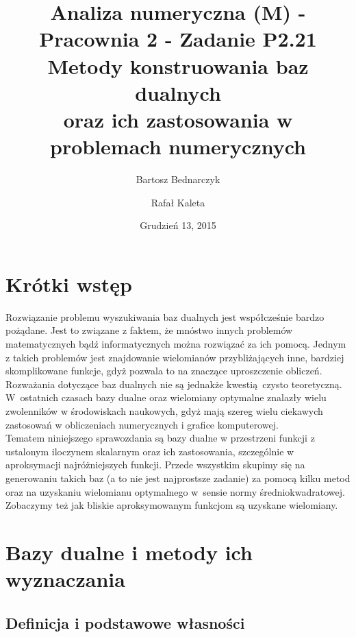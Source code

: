 \documentclass{article}
\title{Analiza numeryczna (M) - Pracownia 2 - Zadanie P2.21\\
Metody konstruowania baz dualnych\\ oraz ich zastosowania w problemach numerycznych}
\date{Grudzień 13, 2015}
\author{Bartosz Bednarczyk\\ \and Rafał Kaleta}
\begin{document}
\maketitle

\tableofcontents

\section{Krótki wstęp}

Rozwiązanie problemu wyszukiwania baz dualnych jest współcześnie bardzo pożądane. Jest to związane z faktem, że mnóstwo innych problemów matematycznych bądź informatycznych można rozwiązać za ich pomocą. Jednym z takich problemów jest znajdowanie wielomianów przybliżających inne, bardziej skomplikowane funkcje, gdyż pozwala to na znaczące uproszczenie obliczeń. Rozważania dotyczące baz dualnych nie są jednakże kwestią czysto teoretyczną. W~ostatnich czasach bazy dualne oraz wielomiany optymalne znalazły wielu zwolenników w środowiskach naukowych, gdyż mają szereg wielu ciekawych zastosowań w obliczeniach numerycznych i grafice komputerowej.\\

Tematem niniejszego sprawozdania są bazy dualne w przestrzeni funkcji z ustalonym iloczynem skalarnym oraz ich zastosowania, szczególnie w aproksymacji najróżniejszych funkcji. Przede wszystkim skupimy się na generowaniu takich baz (a to nie jest najprostsze zadanie) za pomocą kilku metod oraz na uzyskaniu wielomianu optymalnego w~sensie normy średniokwadratowej. Zobaczymy też jak bliskie aproksymowanym funkcjom są uzyskane wielomiany.

\section{Bazy dualne i metody ich wyznaczania}

\subsection{Definicja i podstawowe własności}
\end{document}

